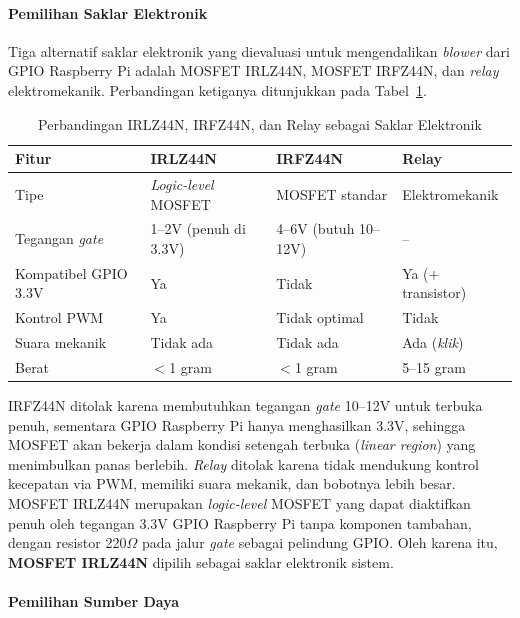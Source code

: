 \paragraph{Pemilihan Saklar Elektronik}

Tiga alternatif saklar elektronik yang dievaluasi untuk mengendalikan \emph{blower} dari GPIO Raspberry Pi adalah MOSFET IRLZ44N, MOSFET IRFZ44N, dan \emph{relay} elektromekanik. Perbandingan ketiganya ditunjukkan pada Tabel~\ref{tab:perbandingan-mosfet}.

\begin{table}[H]
\centering
\caption{Perbandingan IRLZ44N, IRFZ44N, dan Relay sebagai Saklar Elektronik}
\label{tab:perbandingan-mosfet}
\begin{tabular}{|p{3cm}|p{3.5cm}|p{3.5cm}|p{3.5cm}|}
\hline
\textbf{Fitur} & \textbf{IRLZ44N} & \textbf{IRFZ44N} & \textbf{Relay} \\
\hline
Tipe & \emph{Logic-level} MOSFET & MOSFET standar & Elektromekanik \\
\hline
Tegangan \emph{gate} & 1--2V (penuh di 3.3V) & 4--6V (butuh 10--12V) & -- \\
\hline
Kompatibel GPIO 3.3V & Ya & Tidak & Ya (+ transistor) \\
\hline
Kontrol PWM & Ya & Tidak optimal & Tidak \\
\hline
Suara mekanik & Tidak ada & Tidak ada & Ada (\emph{klik}) \\
\hline
Berat & $<$1 gram & $<$1 gram & 5--15 gram \\
\hline
\end{tabular}
\end{table}

IRFZ44N ditolak karena membutuhkan tegangan \emph{gate} 10--12V untuk terbuka penuh, sementara GPIO Raspberry Pi hanya menghasilkan 3.3V, sehingga MOSFET akan bekerja dalam kondisi setengah terbuka (\emph{linear region}) yang menimbulkan panas berlebih. \emph{Relay} ditolak karena tidak mendukung kontrol kecepatan via PWM, memiliki suara mekanik, dan bobotnya lebih besar. MOSFET IRLZ44N merupakan \emph{logic-level} MOSFET yang dapat diaktifkan penuh oleh tegangan 3.3V GPIO Raspberry Pi tanpa komponen tambahan, dengan resistor 220$\Omega$ pada jalur \emph{gate} sebagai pelindung GPIO. Oleh karena itu, \textbf{MOSFET IRLZ44N} dipilih sebagai saklar elektronik sistem.

\paragraph{Pemilihan Sumber Daya}

